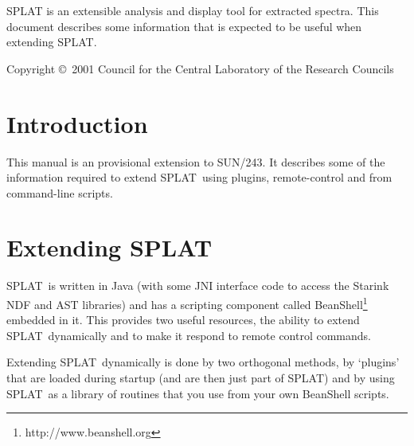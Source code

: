 \documentclass[twoside,11pt]{article}
\newcommand{\stardocinitials}  {PROG}
\newcommand{\stardoccopyright}
{Copyright \copyright\ 2001 Council for the Central Laboratory of the
Research Councils}
\newcommand{\stardocnumber}    {1.1}
\newcommand{\stardocabstract}  {
\textsf{SPLAT} is an extensible analysis and display tool for extracted
spectra. This document describes some information that is expected to
be useful when extending \textsf{SPLAT}.
}
\newcommand{\stardocname}{\stardocinitials /\stardocnumber}
\newcommand{\htmladdnormallinkfoot}[2]{#1\footnote{#2}}
\newenvironment{latexonly}{}{}
\newcommand{\xref}[3]{#1}
\newcommand{\xlabel}[1]{}
\renewcommand{\_}{\texttt{\symbol{95}}}
\newcommand{\SPLAT}{\textsf{SPLAT}}
\renewcommand{\thepage}{\roman{page}}
\begin{document}
\begin{center}
\stardocabstract
\end{center}

\begin{latexonly}
\newpage
\vspace*{\fill}
\stardoccopyright
\end{latexonly}

\newpage
\begin{latexonly}
  \setlength{\parskip}{0mm}
  \tableofcontents
  \setlength{\parskip}{\medskipamount}
  \markboth{\stardocname}{\stardocname}
\end{latexonly}

\cleardoublepage
\renewcommand{\thepage}{\arabic{page}}
\setcounter{page}{1}


\section{Introduction\xlabel{introduction}}

This manual is an provisional extension to
\xref{SUN/243}{sun243}{}. It describes some of the information
required to extend \SPLAT\ using plugins, remote-control and from
command-line scripts.

\section{Extending \SPLAT}

\SPLAT\ is written in Java (with some JNI interface code to access the
Starink NDF and AST libraries) and has a scripting component called
\htmladdnormallinkfoot{BeanShell}{http://www.beanshell.org}
embedded in it. This provides two useful resources, the ability to
extend \SPLAT\ dynamically and to make it respond to remote
control commands.

Extending \SPLAT\ dynamically is done by two orthogonal methods, by
`plugins' that are loaded during startup (and are then just part of
\SPLAT) and by using \SPLAT\ as a
library of routines that you use from your own BeanShell scripts.
\end{document}
